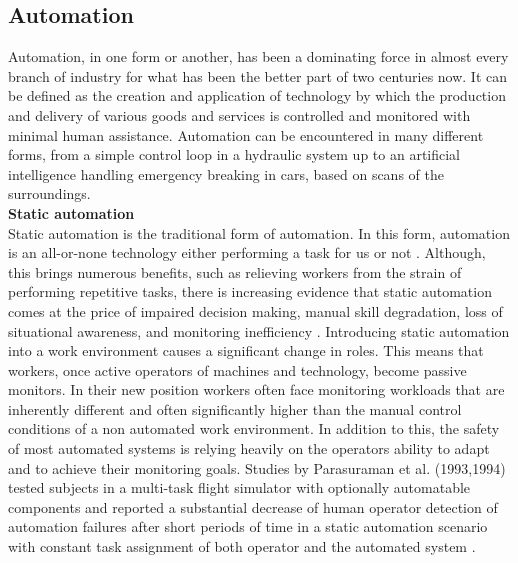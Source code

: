\subsection{Automation}
Automation, in one form or another, has been a dominating force in almost every branch of industry for what has been the better part of two centuries now. It can be defined as the creation and application of technology by which the production and delivery of various goods and services is controlled and monitored with minimal human assistance. 
Automation can be encountered in many different forms, from a simple control loop in a hydraulic system up to an artificial intelligence handling emergency breaking in cars, based on scans of the surroundings.\\[10pt]
\textbf{Static automation}\\[10pt]
Static automation is the traditional form of automation. In this form, automation is an all-or-none technology either performing a task for us or not \cite{Byrne2006}. 
Although, this brings numerous benefits, such as relieving workers from the strain of performing repetitive tasks, there is increasing evidence that static automation comes at the price of impaired decision making, manual skill degradation, loss of situational awareness, and monitoring inefficiency \cite{Byrne2006}. 
Introducing static automation into a work environment causes a significant change in roles. 
This means that workers, once active operators of machines and technology, become passive monitors. In their new position workers often face monitoring workloads that are inherently different and often significantly higher than the manual control conditions of a non automated work environment. In addition to this, the safety of most automated systems is relying heavily on the operators ability to adapt and to achieve their monitoring goals.  
Studies by Parasuraman et al. (1993,1994) tested subjects in a multi-task flight simulator with optionally automatable components and reported a substantial decrease of human operator detection of automation failures after short periods of time in a static automation scenario with constant task assignment of both operator and the automated system \cite{Byrne2006}.
